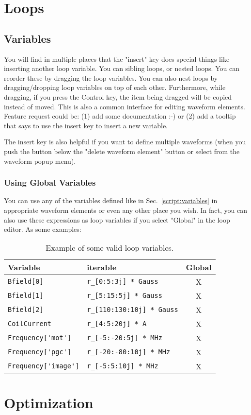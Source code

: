 \thispagestyle{fancy}
\pagestyle{fancy}
\section{Loops}
  \subsection{Variables}

  You will find in multiple places that the "insert" key does special things
  like inserting another loop variable.  You can sibling loops, or nested loops.
  You can reorder these by dragging the loop variables.  You can also nest loops
  by dragging/dropping loop variables on top of each other.  Furthermore, while
  dragging, if you press the Control key, the item being dragged will be copied
  instead of moved.  This is also a common interface for editing waveform
  elements.
  Feature request could be:  (1) add some documentation :-) or (2) add a tooltip
  that says to use the insert key to insert a new variable. 



  The insert key is also helpful if you want to define multiple waveforms (when
  you push the button below the "delete waveform element" button or select from
  the waveform popup menu).


  \subsubsection{Using Global Variables}
  You can use any of the variables defined like in Sec.~\ref{script:variables}
  in appropriate waveform elements or even any other place you wish.  In fact,
  you can also use these expressions as loop variables if you select "Global" in
  the loop editor.  As some examples:

  \begin{table}[ht!]
    \center
    \begin{tabular}{p{5cm} m{6cm}c}
    Variable                  &                iterable            &   Global\\
    \hline \hline
    \verb|Bfield[0]|          &       \verb|r_[0:5:3j] * Gauss|      &    X \\
    \verb|Bfield[1]|          &       \verb|r_[5:15:5j] * Gauss|     &    X \\
    \verb|Bfield[2]|          &       \verb|r_[110:130:10j] * Gauss| &    X \\
    \verb|CoilCurrent|        &       \verb|r_[4:5:20j] * A|         &    X \\
    \verb|Frequency['mot']|   &       \verb|r_[-5:-20:5j] * MHz|   &      X \\
    \verb|Frequency['pgc']|   &       \verb|r_[-20:-80:10j] * MHz| &      X \\
    \verb|Frequency['image']| &       \verb|r_[-5:5:10j] * MHz|    &      X \\
    \end{tabular}

    \caption{
      Example of some valid loop variables.
    }
  \end{table}




\section{Optimization}
